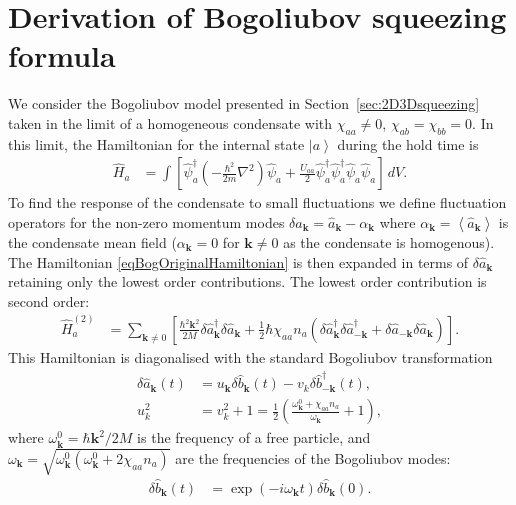\documentclass{iopart}
\newcommand{\expect}[1]{\ensuremath{\left<#1\right>}}
\newcommand{\ket}[1]{\ensuremath{\left|#1\right>}}
\begin{document}
\section{Derivation of Bogoliubov squeezing formula}
\label{appendixBogDerivation}

We consider the Bogoliubov model presented in Section~\ref{sec:2D3Dsqueezing} taken in the limit of a homogeneous condensate with $\chi_{aa}\neq 0$, $\chi_{ab}=\chi_{bb}=0$.  In this limit, the Hamiltonian for the internal state $\ket{a}$ during the hold time is
\begin{align}
  \hat{H}_{a} &= \int \left[ \hat{\psi}_a^\dagger \left(-\frac{\hbar^2}{2 m}\nabla^2\right) \hat{\psi}_a + \frac{U_{aa}}{2} \hat{\psi}_a^\dagger \hat{\psi}_a^\dagger \hat{\psi}_a \hat{\psi}_a \right] \,dV. \label{eqBogOriginalHamiltonian}
\end{align}
To find the response of the condensate to small fluctuations we define fluctuation operators for the non-zero momentum modes $\delta\hat{a}_\mathbf{k} = \hat{a}_\mathbf{k} - \alpha_\mathbf{k}$ where $\alpha_\mathbf{k} = \expect{\hat{a}_\mathbf{k}}$ is the condensate mean field ($\alpha_\mathbf{k}=0$ for $\mathbf{k} \neq 0$ as the condensate is homogenous).  The Hamiltonian \eqref{eqBogOriginalHamiltonian} is then expanded in terms of $\delta\hat{a}_\mathbf{k}$ retaining only the lowest order contributions.  The lowest order contribution is second order:
\begin{align}
  \hat{H}_{a}^{(2)} &= \sum_{\mathbf{k}\neq 0} \left[ \frac{\hbar^2 \mathbf{k}^2}{2M} \delta\hat{a}_\mathbf{k}^\dagger \delta\hat{a}_\mathbf{k} + \frac{1}{2} \hbar \chi_{aa} n_a \left(\delta\hat{a}_\mathbf{k}^\dagger \delta\hat{a}_{-\mathbf{k}}^\dagger + \delta\hat{a}_{-\mathbf{k}} \delta\hat{a}_{\mathbf{k}} \right) \right].
\end{align}
This Hamiltonian is diagonalised with the standard Bogoliubov transformation \cite{PethickSmith}
\begin{align}
  \delta \hat{a}_\mathbf{k}(t) &= u_\mathbf{k} \delta\hat{b}_\mathbf{k}(t) - v_k \delta\hat{b}_{-\mathbf{k}}^\dagger(t),\\
  u_k^2 &= v_k^2+1 = \frac{1}{2} \left(\frac{\omega^0_\mathbf{k} + \chi_{aa}n_a}{\omega_\mathbf{k}} +1\right),
\end{align}
where $\omega^0_\mathbf{k} = \hbar \mathbf{k}^2/2M$ is the frequency of a free particle, and $\omega_\mathbf{k} = \sqrt{\omega^0_\mathbf{k}(\omega^0_\mathbf{k} + 2 \chi_{aa} n_a)}$ are the frequencies of the Bogoliubov modes:
\begin{align}
  \delta\hat{b}_\mathbf{k}(t) &= \exp\left(-i \omega_\mathbf{k} t\right)\delta\hat{b}_\mathbf{k}(0).
\end{align}
\end{document}
